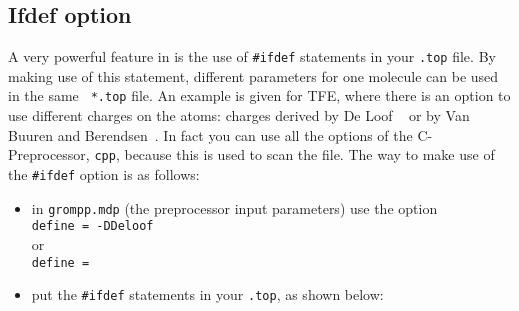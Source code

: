 \subsection{Ifdef option}
\label{subsec:ifdef}
A very powerful feature in {\gromacs} is the use of {\tt \#ifdef}
statements in your {\tt *.top} file. By making use of this statement,
different parameters for one molecule can be used in the same {\tt
*.top} file. An example is given for TFE, where there is an option to
use different charges on the atoms: charges derived by De Loof
{\etal}~\cite{Loof92} or by Van Buuren and
Berendsen~\cite{Buuren93a}. In fact you can use all the options of the
C-Preprocessor, {\tt cpp}, because this is used to scan the file.  The
way to make use of the {\tt \#ifdef} option is as follows:
\begin{itemize}
\item in {\tt grompp.mdp} (the {\gromacs} preprocessor input
      parameters) use the option\\{\tt define = -DDeloof}\\ or
      \\{\tt define = }
\item put the {\tt \#ifdef} statements in your {\tt *.top}, as
      shown below: 
\end{itemize}
